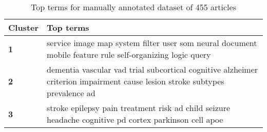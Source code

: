 \begin{table}
\begin{tabular}{|p{2cm}|p{10.5cm}|} 
\hline %
\textbf{Cluster} & \textbf{Top terms} \\
\hline 
\textbf{1} & service image map system filter user som neural document mobile feature rule self-organizing logic query  \\
\hline
\hline 
\textbf{2} & dementia vascular vad trial subcortical cognitive alzheimer criterion impairment cause lesion stroke subtypes prevalence ad  \\
\hline
\hline 
\textbf{3} & stroke epilepsy pain treatment risk ad child seizure headache cognitive pd cortex parkinson cell apoe \\
\hline
\hline 
\end{tabular} %
\caption{Top terms for manually annotated dataset of 455 articles}
\label{table:topterms_455_hier}
\end{table} %
